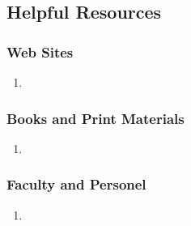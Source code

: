\subsection{Helpful Resources}
\subsubsection{Web Sites}
\begin{enumerate}
\item{}
\end{enumerate}

\subsubsection{Books and Print Materials}
\begin{enumerate}
\item{}
\end{enumerate}

\subsubsection{Faculty and Personel}
\begin{enumerate}
\item{}
\end{enumerate}
